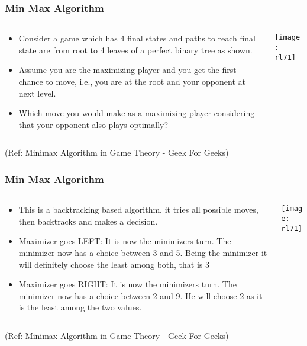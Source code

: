 \begin{frame}[fragile]\frametitle{Min Max Algorithm}


\begin{columns}
\begin{column}{0.5\textwidth}
\begin{itemize}
\item Consider a game which has 4 final states and paths to reach final state are from root to 4 leaves of a perfect binary tree as shown.
\item Assume you are the maximizing player and you get the first chance to move, i.e., you are at the root and your opponent at next level. 
\item Which move you would make as a maximizing player considering that your opponent also plays optimally?
\end{itemize}

\end{column}
\begin{column}{0.5\textwidth}  %
\begin{center}
\texttt{[image: rl71]}
\end{center}
\end{column}
\end{columns}

{\tiny (Ref: Minimax Algorithm in Game Theory - Geek For Geeks)}

\end{frame}

\begin{frame}[fragile]\frametitle{Min Max Algorithm}


\begin{columns}
\begin{column}{0.5\textwidth}
\begin{itemize}
\item This is a backtracking based algorithm, it tries all possible moves, then backtracks and makes a decision. 
\item Maximizer goes LEFT: It is now the minimizers turn. The minimizer now has a choice between 3 and 5. Being the minimizer it will definitely choose the least among both, that is 3
\item Maximizer goes RIGHT: It is now the minimizers turn. The minimizer now has a choice between 2 and 9. He will choose 2 as it is the least among the two values.
\end{itemize}

\end{column}
\begin{column}{0.5\textwidth}  %
\begin{center}
\texttt{[image: rl71]}
\end{center}
\end{column}
\end{columns}

{\tiny (Ref: Minimax Algorithm in Game Theory - Geek For Geeks)}

\end{frame}

